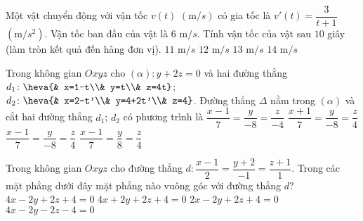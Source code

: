 \begin{ex}%
Một vật chuyển động với vận tốc $v(t)$ $(\mathrm{m}/s)$ có gia tốc là $v'(t)=\dfrac{3}{t+1}$ $(\mathrm{m}/s^2)$. Vận tốc ban đầu của vật là $6$ $\mathrm{m}/s$. Tính vận tốc của vật sau $10$ giây (làm tròn kết quả đến hàng đơn vị).
\choice
{$11$ $\mathrm{m}/s$}
{$12$ $\mathrm{m}/s$}
{\True $13$ $\mathrm{m}/s$}
{$14$ $\mathrm{m}/s$}
\end{ex}

\begin{ex}%
Trong không gian $Oxyz$ cho $(\alpha)\colon y+2z=0$ và hai đường thẳng $d_1\colon\heva{& x=1-t\\& y=t\\& z=4t}$; $d_2\colon\heva{& x=2-t'\\& y=4+2t'\\& z=4}$. Đường thẳng $\Delta$ nằm trong $(\alpha)$ và cắt hai đường thẳng $d_1$; $d_2$ có phương trình là
\choice
{$\dfrac{x-1}{7}=\dfrac{y}{-8}=\dfrac{z}{-4}$}
{$\dfrac{x+1}{7}=\dfrac{y}{-8}=\dfrac{z}{4}$}
{\True $\dfrac{x-1}{7}=\dfrac{y}{-8}=\dfrac{z}{4}$}
{$\dfrac{x-1}{7}=\dfrac{y}{8}=\dfrac{z}{4}$}
\end{ex}

\begin{ex}%
Trong không gian $Oxyz$ cho đường thẳng $d\colon \dfrac{x-1}{2}=\dfrac{y+2}{-1}=\dfrac{z+1}{1}.$ Trong các mặt phẳng dưới đây mặt phẳng nào vuông góc với đường thẳng $d$?
\choice
{\True $4x-2y+2z+4=0$}
{$4x+2y+2z+4=0$}
{$2x-2y+2z+4=0$}
{$4x-2y-2z-4=0$}
\end{ex}

